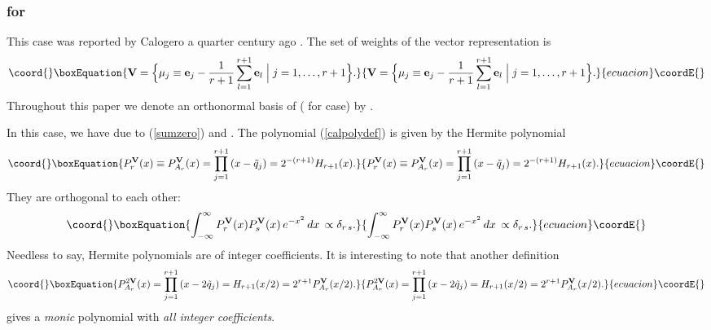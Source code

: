 \documentclass[a4paper,12pt]{article}
\begin{document}
\subsubsection{\coordHE{} for \coordHE{}}

This case was reported by Calogero a quarter century ago \cite{calmat}.
The set of weights of the vector representation is
\begin{equation}\coord{}\boxEquation{
   {\bf V}=\Bigl\{\mu_j\equiv{\bf e}_j-\frac{1}{r+1}\sum_{l=1}^{r+1}{\bf e}_l
   \Bigm|j=1,\ldots,r+1\Bigr\}.
   \label{ArV}
}{
   {\bf V}=\Bigl\{\mu_j\equiv{\bf e}_j-\frac{1}{r+1}\sum_{l=1}^{r+1}{\bf e}_l
   \Bigm|j=1,\ldots,r+1\Bigr\}.
   }{ecuacion}\coordE{}\end{equation}
Throughout this paper we denote an orthonormal basis of \coordHE{}
(\coordHE{} for
\coordHE{} case) by \coordHE{}.

In this case, we have \coordHE{} due to (\ref{sumzero})
and \coordHE{}.
The polynomial (\ref{calpolydef}) is given by the Hermite polynomial
\begin{equation}\coord{}\boxEquation{
   P_r^{\bf V}(x)\equiv P_{A_r}^{\bf V}(x)=
   \prod_{j=1}^{r+1}\left(x-\tilde{q}_j\right)
   =2^{-(r+1)}H_{r+1}(x).
   \label{hermpoly}
}{
   P_r^{\bf V}(x)\equiv P_{A_r}^{\bf V}(x)=
   \prod_{j=1}^{r+1}\left(x-\tilde{q}_j\right)
   =2^{-(r+1)}H_{r+1}(x).
   }{ecuacion}\coordE{}\end{equation}
They are orthogonal to each other:
\begin{equation}\coord{}\boxEquation{
   \int_{-\infty}^\infty P_r^{\bf V}(x)P_s^{\bf V}(x)\,e^{-x^2}\,dx\,
   \propto\delta_{r\,s}.
}{
   \int_{-\infty}^\infty P_r^{\bf V}(x)P_s^{\bf V}(x)\,e^{-x^2}\,dx\,
   \propto\delta_{r\,s}.
}{ecuacion}\coordE{}\end{equation}
Needless to say, Hermite polynomials are of integer coefficients.
It is interesting to note that another definition
\begin{equation}\coord{}\boxEquation{
   P_{A_r}^{2{\bf V}}(x)=
   \prod_{j=1}^{r+1}\left(x-2\tilde{q}_j\right)
   =H_{r+1}(x/2)=2^{r+1}P_{A_r}^{\bf V}(x/2).
   \label{hermpoly2}
}{
   P_{A_r}^{2{\bf V}}(x)=
   \prod_{j=1}^{r+1}\left(x-2\tilde{q}_j\right)
   =H_{r+1}(x/2)=2^{r+1}P_{A_r}^{\bf V}(x/2).
   }{ecuacion}\coordE{}\end{equation}
gives a {\em monic} polynomial with {\em all integer coefficients\/}.
\end{document}

